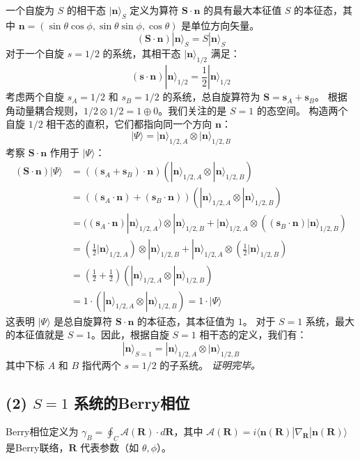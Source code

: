 \documentclass[12pt, a4paper]{article}
\newcommand{\ket}[1]{| #1 \rangle}
\newcommand{\bra}[1]{\langle #1 |}
\newcommand{\nvec}{\mathbf{n}}
\newcommand{\Svec}{\mathbf{S}}
\newcommand{\svec}{\mathbf{s}}
\newcommand{\Rparam}{\mathbf{R}} %
\begin{document}
一个自旋为 \(S\) 的相干态 \(\ket{\nvec}_S\) 定义为算符 \(\Svec \cdot \nvec\) 的具有最大本征值 \(S\) 的本征态，其中 \(\nvec = (\sin\theta\cos\phi, \sin\theta\sin\phi, \cos\theta)\) 是单位方向矢量。
\[ (\Svec \cdot \nvec) \ket{\nvec}_S = S \ket{\nvec}_S \]
对于一个自旋 \(s=1/2\) 的系统，其相干态 \(\ket{\nvec}_{1/2}\) 满足：
\[ (\svec \cdot \nvec) \ket{\nvec}_{1/2} = \frac{1}{2} \ket{\nvec}_{1/2} \]
考虑两个自旋 \(s_A=1/2\) 和 \(s_B=1/2\) 的系统，总自旋算符为 \(\Svec = \svec_A + \svec_B\)。
根据角动量耦合规则，\(1/2 \otimes 1/2 = 1 \oplus 0\)。我们关注的是 \(S=1\) 的态空间。
构造两个自旋 \(1/2\) 相干态的直积，它们都指向同一个方向 \(\nvec\)：
\[ \ket{\Psi} = \ket{\nvec}_{1/2, A} \otimes \ket{\nvec}_{1/2, B} \]
考察 \(\Svec \cdot \nvec\) 作用于 \(\ket{\Psi}\)：
\begin{align*}
(\Svec \cdot \nvec) \ket{\Psi} &= ((\svec_A + \svec_B) \cdot \nvec) (\ket{\nvec}_{1/2, A} \otimes \ket{\nvec}_{1/2, B}) \\
&= ((\svec_A \cdot \nvec) + (\svec_B \cdot \nvec)) (\ket{\nvec}_{1/2, A} \otimes \ket{\nvec}_{1/2, B}) \\
&= ((\svec_A \cdot \nvec) \ket{\nvec}_{1/2, A}) \otimes \ket{\nvec}_{1/2, B} + \ket{\nvec}_{1/2, A} \otimes ((\svec_B \cdot \nvec) \ket{\nvec}_{1/2, B}) \\
&= \left(\frac{1}{2} \ket{\nvec}_{1/2, A}\right) \otimes \ket{\nvec}_{1/2, B} + \ket{\nvec}_{1/2, A} \otimes \left(\frac{1}{2} \ket{\nvec}_{1/2, B}\right) \\
&= \left(\frac{1}{2} + \frac{1}{2}\right) (\ket{\nvec}_{1/2, A} \otimes \ket{\nvec}_{1/2, B}) \\
&= 1 \cdot (\ket{\nvec}_{1/2, A} \otimes \ket{\nvec}_{1/2, B}) = 1 \cdot \ket{\Psi}
\end{align*}
这表明 \(\ket{\Psi}\) 是总自旋算符 \(\Svec \cdot \nvec\) 的本征态，其本征值为 \(1\)。
对于 \(S=1\) 系统，最大的本征值就是 \(S=1\)。因此，根据自旋 \(S=1\) 相干态的定义，我们有：
\[ \ket{\nvec}_{S=1} = \ket{\nvec}_{1/2, A} \otimes \ket{\nvec}_{1/2, B} \]
其中下标 \(A\) 和 \(B\) 指代两个 \(s=1/2\) 的子系统。
\textit{证明完毕。}

\subsection*{(2) \(S=1\) 系统的Berry相位}

Berry相位定义为 \(\gamma_B = \oint_C \mathcal{A}(\Rparam) \cdot d\Rparam\)，其中 \(\mathcal{A}(\Rparam) = i \bra{\nvec(\Rparam)} \nabla_{\Rparam} \ket{\nvec(\Rparam)}\) 是Berry联络，\(\Rparam\) 代表参数（如 \(\theta, \phi\)）。
\end{document}
